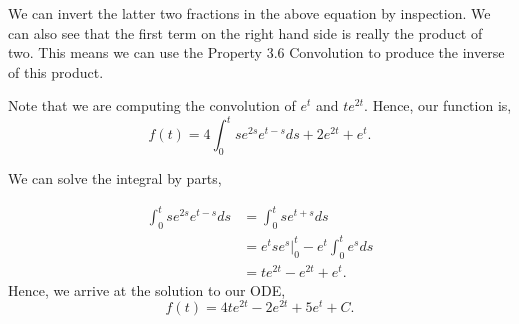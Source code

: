 \documentclass[11pt]{article}
\begin{document}
We can invert the latter two fractions in the above equation by inspection. We can also see that the first term on the right hand side is really the product of two. This means we can use the Property 3.6 Convolution to produce the inverse of this product.

Note that we are computing the convolution of $e^t$ and $te^{2t}$. Hence, our function is,
\begin{equation*}
    f(t) = 4 \int_0^t se^{2s} e^{t-s} ds + 2e^{2t} + e^t.
\end{equation*}

We can solve the integral by parts,

\begin{align*}
    \int_0^t se^{2s} e^{t-s} ds &= \int_0^t se^{t+s} ds \\
    &= e^t se^s \bigg|_0^t - e^t \int_0^t e^s ds \\
    &= te^{2t} - e^{2t} + e^t. 
\end{align*}
Hence, we arrive at the solution to our ODE,
\begin{equation*}
    f(t) = 4te^{2t} - 2e^{2t} + 5e^t + C. 
\end{equation*}
\end{document}
